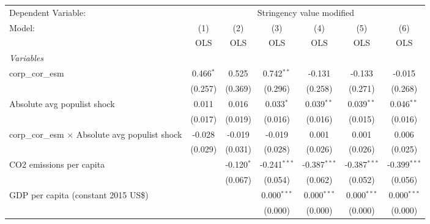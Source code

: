 
\begingroup
\centering
\begin{tabular}{lcccccc}
   \toprule
   Dependent Variable: & \multicolumn{6}{c}{Stringency value modified}\\
   Model:                                                 & (1)         & (2)          & (3)            & (4)            & (5)            & (6)\\  
                                                          &  OLS        & OLS          & OLS            & OLS            & OLS            & OLS\\  
   \midrule
   \emph{Variables}\\
   corp\_cor\_esm                                         & 0.466$^{*}$ & 0.525        & 0.742$^{**}$   & -0.131         & -0.133         & -0.015\\   
                                                          & (0.257)     & (0.369)      & (0.296)        & (0.258)        & (0.271)        & (0.268)\\   
   Absolute avg populist shock                            & 0.011       & 0.016        & 0.033$^{*}$    & 0.039$^{**}$   & 0.039$^{**}$   & 0.046$^{**}$\\   
                                                          & (0.017)     & (0.019)      & (0.016)        & (0.016)        & (0.015)        & (0.016)\\   
   corp\_cor\_esm $\times$ Absolute avg populist shock    & -0.028      & -0.019       & -0.019         & 0.001          & 0.001          & 0.006\\   
                                                          & (0.029)     & (0.031)      & (0.028)        & (0.026)        & (0.026)        & (0.025)\\   
   CO2 emissions per capita                               &             & -0.120$^{*}$ & -0.241$^{***}$ & -0.387$^{***}$ & -0.387$^{***}$ & -0.399$^{***}$\\   
                                                          &             & (0.067)      & (0.054)        & (0.062)        & (0.052)        & (0.056)\\   
   GDP per capita (constant 2015 US\$)                    &             &              & 0.000$^{***}$  & 0.000$^{***}$  & 0.000$^{***}$  & 0.000$^{***}$\\   
                                                          &             &              & (0.000)        & (0.000)        & (0.000)        & (0.000)\\   

\end{tabular}

